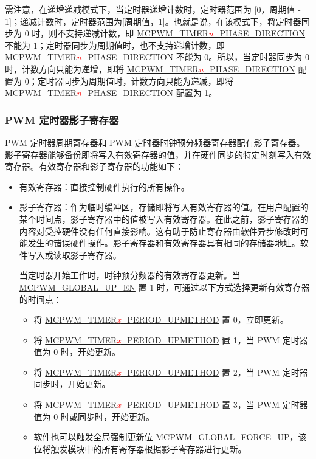 \documentclass[main\_\_CN.tex]{subfiles}
\begin{document}
需注意，在递增递减模式下，当定时器递增计数时，定时器范围为 [0，周期值 - 1]；递减计数时，定时器范围为[周期值，1]。也就是说，在该模式下，将定时器同步为 0 时，则不支持递减计数，即 \hyperref[fielddesc:MCPWMTIMER0PHASEDIRECTION]{MCPWM\_TIMER\textcolor{red}{\it{n}}\_PHASE\_DIRECTION} 不能为 1；定时器同步为周期值时，也不支持递增计数，即 \hyperref[fielddesc:MCPWMTIMER0PHASEDIRECTION]{MCPWM\_TIMER\textcolor{red}{\it{n}}\_PHASE\_DIRECTION} 不能为 0。所以，当定时器同步为 0 时，计数方向只能为递增，即将 \hyperref[fielddesc:MCPWMTIMER0PHASEDIRECTION]{MCPWM\_TIMER\textcolor{red}{\it{n}}\_PHASE\_DIRECTION} 配置为 0；定时器同步为周期值时，计数方向只能为递减，即将 \hyperref[fielddesc:MCPWMTIMER0PHASEDIRECTION]{MCPWM\_TIMER\textcolor{red}{\it{n}}\_PHASE\_DIRECTION} 配置为 1。


\subsubsection{PWM 定时器影子寄存器}
\label{sec:mcpwm-shdw_reg}

PWM 定时器周期寄存器和 PWM 定时器时钟预分频器寄存器配有影子寄存器。影子寄存器能够备份即将写入有效寄存器的值，并在硬件同步的特定时刻写入有效寄存器。有效寄存器和影子寄存器的功能如下：
\begin{itemize}
    \item 有效寄存器：直接控制硬件执行的所有操作。
    \item 影子寄存器：作为临时缓冲区，存储即将写入有效寄存器的值。在用户配置的某个时间点，影子寄存器中的值被写入有效寄存器。在此之前，影子寄存器的内容对受控硬件没有任何直接影响。这有助于防止寄存器由软件异步修改时可能发生的错误硬件操作。影子寄存器和有效寄存器具有相同的存储器地址。软件写入或读取影子寄存器。
    
    当定时器开始工作时，时钟预分频器的有效寄存器更新。当 \hyperref[fielddesc:MCPWMGLOBALUPEN]{MCPWM\_GLOBAL\_UP\_EN} 置 1 时，可通过以下方式选择更新有效寄存器的时间点：
    \begin{itemize}
        \item 将 \hyperref[fielddesc:MCPWMTIMER0PERIODUPMETHOD]{MCPWM\_TIMER\textcolor{red}{\it{x}}\_PERIOD\_UPMETHOD} 置 0，立即更新。
        \item 将 \hyperref[fielddesc:MCPWMTIMER0PERIODUPMETHOD]{MCPWM\_TIMER\textcolor{red}{\it{x}}\_PERIOD\_UPMETHOD} 置 1，当 PWM 定时器值为 0 时，开始更新。
        \item 将 \hyperref[fielddesc:MCPWMTIMER0PERIODUPMETHOD]{MCPWM\_TIMER\textcolor{red}{\it{x}}\_PERIOD\_UPMETHOD} 置 2，当 PWM 定时器同步时，开始更新。
        \item 将 \hyperref[fielddesc:MCPWMTIMER0PERIODUPMETHOD]{MCPWM\_TIMER\textcolor{red}{\it{x}}\_PERIOD\_UPMETHOD} 置 3，当 PWM 定时器值为 0 时或同步时，开始更新。
        \item 软件也可以触发全局强制更新位 \hyperref[fielddesc:MCPWMGLOBALFORCEUP]{MCPWM\_GLOBAL\_FORCE\_UP}，该位将触发模块中的所有寄存器根据影子寄存器进行更新。
    \end{itemize}
\end{itemize}
\end{document}

